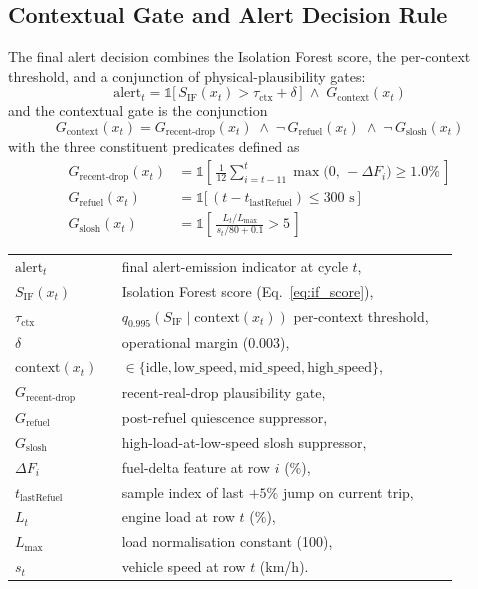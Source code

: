 \subsection{Contextual Gate and Alert Decision Rule}
\label{sec:contextual_gate_math}

The final alert decision combines the Isolation Forest score, the per-context threshold, and a conjunction of physical-plausibility gates:
\begin{equation}
\mathrm{alert}_t = \mathbb{1}\bigl[\, S_{\mathrm{IF}}(x_t) > \tau_{\mathrm{ctx}} + \delta \,\bigr] \;\wedge\; G_{\mathrm{context}}(x_t)
\label{eq:alert_rule}
\end{equation}
and the contextual gate is the conjunction
\begin{equation}
G_{\mathrm{context}}(x_t) = G_{\mathrm{recent\text{-}drop}}(x_t) \;\wedge\; \neg\, G_{\mathrm{refuel}}(x_t) \;\wedge\; \neg\, G_{\mathrm{slosh}}(x_t)
\label{eq:gate_conjunction}
\end{equation}
with the three constituent predicates defined as
\begin{align}
G_{\mathrm{recent\text{-}drop}}(x_t) &= \mathbb{1}\!\left[\, \frac{1}{12} \sum_{i = t-11}^{t} \max\bigl(0,\, -\Delta F_i\bigr) \geq 1.0\% \,\right] \label{eq:gate_recent_drop}\\
G_{\mathrm{refuel}}(x_t) &= \mathbb{1}\bigl[\, (t - t_{\mathrm{lastRefuel}}) \leq 300\text{ s} \,\bigr] \label{eq:gate_refuel}\\
G_{\mathrm{slosh}}(x_t) &= \mathbb{1}\!\left[\, \frac{L_t / L_{\max}}{s_t / 80 + 0.1} > 5 \,\right] \label{eq:gate_slosh}
\end{align}
\noindent\begin{tabular}{@{}p{0.20\linewidth}@{\quad}p{0.68\linewidth}@{}}
$\mathrm{alert}_t$ & final alert-emission indicator at cycle $t$, \\
$S_{\mathrm{IF}}(x_t)$ & Isolation Forest score (Eq.~\ref{eq:if_score}), \\
$\tau_{\mathrm{ctx}}$ & $q_{0.995}(S_{\mathrm{IF}} \mid \mathrm{context}(x_t))$ per-context threshold, \\
$\delta$ & operational margin (0.003), \\
$\mathrm{context}(x_t)$ & $\in \{\mathrm{idle}, \mathrm{low\_speed}, \mathrm{mid\_speed}, \mathrm{high\_speed}\}$, \\
$G_{\mathrm{recent\text{-}drop}}$ & recent-real-drop plausibility gate, \\
$G_{\mathrm{refuel}}$ & post-refuel quiescence suppressor, \\
$G_{\mathrm{slosh}}$ & high-load-at-low-speed slosh suppressor, \\
$\Delta F_i$ & fuel-delta feature at row $i$ (\%), \\
$t_{\mathrm{lastRefuel}}$ & sample index of last $+5\%$ jump on current trip, \\
$L_t$ & engine load at row $t$ (\%), \\
$L_{\max}$ & load normalisation constant (100), \\
$s_t$ & vehicle speed at row $t$ (km/h).
\end{tabular}

